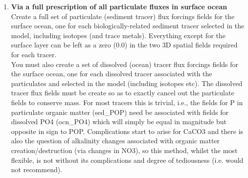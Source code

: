 \documentclass[11pt,fleqn]{book} %
\begin{document}
\begin{enumerate}[noitemsep]

\vspace{1mm}
        \item \textbf{Via a full prescription of all particulate fluxes in surface ocean}
                \\Create a full set of particulate (sediment tracer) flux forcings fields for the surface ocean, one for each biologically-related sediment tracer selected in the model, including isotopes (and trace metals). Everything except for the surface layer can be left as a zero (0.0) in the two 3D spatial fields required for each tracer.
        \\You must also create a set of dissolved (ocean) tracer flux forcings fields for the surface ocean, one for each dissolved tracer associated with the particulates and selected in the model (including isotopes etc). The dissolved tracer flux fields must be create so as to exactly cancel out the particulate fields to conserve mass. For most tracers this is trivial, i.e., the fields for P in particulate organic matter (sed\_POP) need be associated with fields for dissolved PO4 (ocn\_PO4) which will simply be equal in magnitude but opposite in sign to POP. Complications start to arise for CaCO3 and there is also the question of alkalinity changes associated with organic matter creation/destruction (via changes in NO3), so this method, whilst the most flexible, is not without its complications and degree of tediousness (i.e. would not recommend).
        

\end{enumerate}
\end{document}
